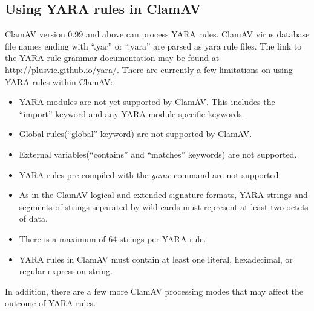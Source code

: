 \documentclass[a4paper,titlepage,12pt]{article}
\begin{document}
    \subsection{Using YARA rules in ClamAV}
    ClamAV version 0.99 and above can process YARA rules. ClamAV virus database file names ending
    with ``.yar'' or ``.yara'' are parsed as yara rule files. The link to the YARA rule grammar
    documentation may be found at http://plusvic.github.io/yara/. There are currently a few 
    limitations on using YARA rules within ClamAV:
    \begin{itemize}
        \item YARA modules are not yet supported by ClamAV. This includes the ``import''
        keyword and any YARA module-specific keywords.
        \item Global rules(``global'' keyword) are not supported by ClamAV.
        \item External variables(``contains'' and ``matches'' keywords) are not supported.
        \item YARA rules pre-compiled with the \emph{yarac} command are not supported.
        \item As in the ClamAV logical and extended signature formats, YARA strings and segments
        of strings separated by wild cards must represent at least two octets of data.
        \item There is a maximum of 64 strings per YARA rule.
        \item YARA rules in ClamAV must contain at least one literal, hexadecimal, or
        regular expression string.
    \end{itemize}
    In addition, there are a few more ClamAV processing modes that may affect the outcome of YARA rules.
\end{document}
